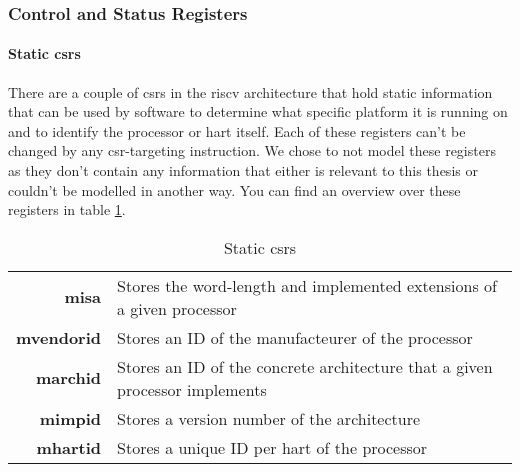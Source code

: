 \subsubsection{Control and Status Registers}

\paragraph{Static \glspl{csr}}
There are a couple of \glspl{csr} in the \gls{riscv} architecture that hold static information that can be used by software to determine what specific platform it is running on and to identify the processor or \gls{hart} itself.
Each of these registers can't be changed by any \gls{csr}-targeting instruction.
We chose to not model these registers as they don't contain any information that either is relevant to this thesis or couldn't be modelled in another way.
You can find an overview over these registers in table \ref{tbl:static-csrs}.

\begin{table}
    \centering
    \renewcommand{\arraystretch}{1.25}
    \begin{tabular}{| r | p{8cm} |}
        \hline
        \textbf{\acrshort{misa}} & Stores the word-length and implemented extensions of a given processor \\
        \textbf{\acrshort{mvendorid}} & Stores an ID of the manufacteurer of the processor \\
        \textbf{\acrshort{marchid}} & Stores an ID of the concrete architecture that a given processor implements \\
        \textbf{\acrshort{mimpid}} & Stores a version number of the architecture \\
        \textbf{\acrshort{mhartid}} & Stores a unique ID per \gls{hart} of the processor \\
        \hline
    \end{tabular}
    \caption{Static \glspl{csr}}
    \label{tbl:static-csrs}
\end{table}

